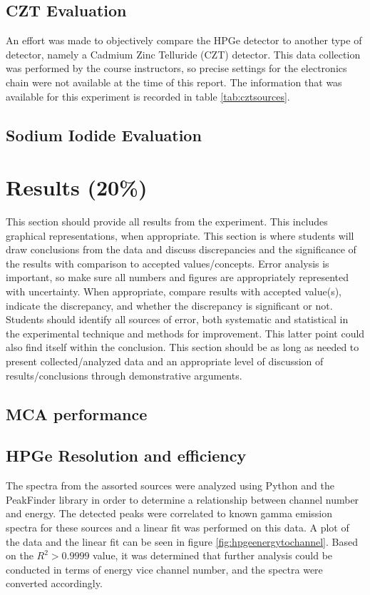 \documentclass[12pt]{article}
\begin{document}
\subsection{CZT Evaluation}
An effort was made to objectively compare the HPGe detector to another type of detector, namely a Cadmium Zinc Telluride (CZT) detector. This data collection was performed by the course instructors, so precise settings for the electronics chain were not available at the time of this report. The information that was available for this experiment is recorded in table \ref{tab:cztsources}.

\subsection{Sodium Iodide Evaluation}


\section{Results (20\%)}
This section should provide all results from the experiment. This includes graphical representations, when appropriate. This section is where students will draw conclusions from the data and discuss discrepancies and the significance of the results with comparison to accepted values/concepts. Error analysis is important, so make sure all numbers and figures are appropriately represented with uncertainty. When appropriate, compare results with accepted value(s), indicate the discrepancy, and whether the discrepancy is significant or not. Students should identify all sources of error, both systematic and statistical in the experimental technique and methods for improvement. This latter point could also find itself within the conclusion. This section should be as long as needed to present collected/analyzed data and an appropriate level of discussion of results/conclusions through demonstrative arguments.

\subsection{MCA performance}

\subsection{HPGe Resolution and efficiency}
The spectra from the assorted sources were analyzed using Python and the PeakFinder library
in order to determine a relationship between channel number and energy. The detected peaks were correlated to known gamma emission spectra for these sources and a linear fit was performed on this data. A plot of the data and the linear fit can be seen in figure \ref{fig:hpgeenergytochannel}. Based on the $R^2>0.9999$ value, it was determined that further analysis could be conducted in terms of energy vice channel number, and the spectra were converted accordingly.
\end{document}
